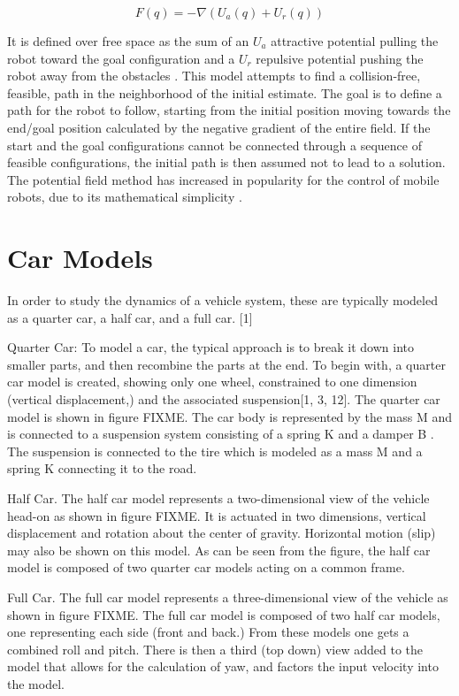$$F(q)=-\nabla(U_a(q)+U_r(q))$$

It is defined over free space as the sum of an $U_a$ attractive potential pulling the robot toward the goal configuration and a $U_r$ repulsive potential pushing the robot away from the obstacles \cite{potential_fields_convoy}. This model attempts to find a collision-free, feasible, path in the neighborhood of the initial estimate. The goal is to define a path for the robot to follow, starting from the initial position moving towards the end/goal position calculated by the negative gradient of the entire field. If the start and the goal configurations cannot be connected through a sequence of feasible configurations, the initial path is then assumed not to lead to a solution. The potential field method has increased in popularity for the control of mobile robots, due to its mathematical simplicity \cite{potential_fields_convoy}.

\section{Car Models}
In order to study the dynamics of a vehicle system, these are typically modeled as a quarter car, a half car, and a full car. [1]

Quarter Car: To model a car, the typical approach is to break it down into smaller parts, and then recombine the parts at the end. To begin with, a quarter car model is created, showing only one wheel, constrained to one dimension (vertical displacement,) and the associated suspension[1, 3, 12]. The quarter car model is shown in figure FIXME. The car body is represented by the mass M and is connected to a suspension system consisting of a spring K and a damper B . The suspension is connected to the tire which is modeled as a mass M and a spring K connecting it to the road.


Half Car. The half car model represents a two-dimensional view of the vehicle head-on as shown in figure FIXME. It is actuated in two dimensions, vertical displacement and rotation about the center of gravity. Horizontal motion (slip) may also be shown on this model. As can be seen from the figure, the half car model is composed of two quarter car models acting on a common frame.


Full Car. The full car model represents a three-dimensional view of the vehicle as shown in figure FIXME. The full car model is composed of two half car models, one representing each side (front and back.) From these models one gets a combined roll and pitch. There is then a third (top down) view added to the model that allows for the calculation of yaw, and factors the input velocity into the model.


